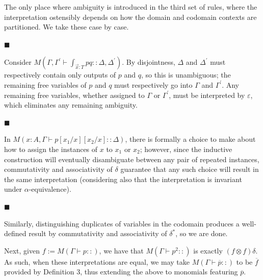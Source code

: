 \documentclass[10pt,a4paper]{amsart}
\begin{document}
 
The only place where ambiguity is introduced in the third set of rules, where the interpretation ostensibly depends on how the domain and codomain contexts are partitioned. We take these case by case.\par
  
\par\noindent  $\blacksquare$ 
 
Consider $M\left(\Gamma,\Gamma^{\prime}\vdash\int_{\vec{x}:T}pq::\Delta,\Delta^{\prime}\right)$. By disjointness, $\Delta$ and $\Delta^{\prime}$ must respectively contain only outputs of $p$ and $q$, so this is unambiguous; the remaining free variables of $p$ and $q$ must respectively go into $\Gamma$ and $\Gamma^{\prime}$. Any remaining free variables, whether assigned to $\Gamma$ or $\Gamma^{\prime}$, must be interpreted by $\varepsilon$, which eliminates any remaining ambiguity.\par
 
 
 
\par\noindent  $\blacksquare$ 
 
In $M(x:A,\Gamma\vdash p[x_{1}/x][x_{2}/x]::\Delta)$, there is formally a choice to make about how to assign the instances of $x$ to $x_{1}$ or $x_{2}$; however, since the inductive construction will eventually disambiguate between any pair of repeated instances, commutativity and associativity of $\delta$ guarantee that any such choice will result in the same interpretation (considering also that the interpretation is invariant under $\alpha$-equivalence).\par
 
 
 
\par\noindent  $\blacksquare$ 
 
Similarly, distinguishing duplicates of variables in the codomain produces a well-defined result by commutativity and associativity of $\delta^{*}$, so we are done.\par
 
 
  
 
 
Next, given $f:=M\left(\Gamma\vdash p::\right)$, we have that $M\left(\Gamma\vdash p^{2}::\right)$ is exactly $(f\otimes f)\delta$. As such, when these interpretations are equal, we may take $M\left(\Gamma\vdash\overline{p}::\right)$ to be $\overline{f}$ provided by Definition 3, thus extending the above to monomials featuring $\overline{p}$.\par
 
\end{document}
